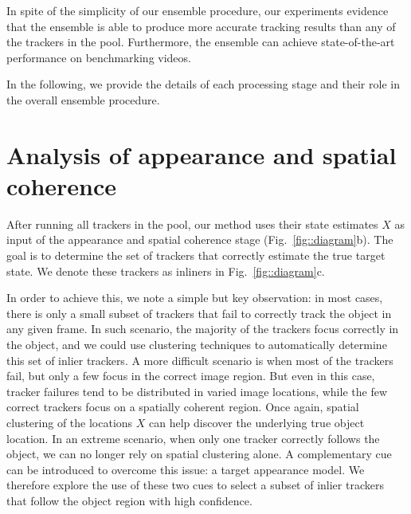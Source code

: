 In spite of the simplicity of our ensemble procedure, our experiments
evidence that the ensemble is able to produce more accurate tracking results
than any of the trackers in the pool. Furthermore, the ensemble can
achieve state-of-the-art performance on benchmarking videos.

In the following, we provide the details of each processing stage and their
role in the overall ensemble procedure.


\section{Analysis of appearance and spatial coherence}
After running all trackers in the pool, our method uses their state estimates
$X$ as input of the appearance and spatial coherence stage
(Fig.~\ref{fig::diagram}b). The goal is to determine the set of
trackers that correctly estimate the true target state. We denote these trackers
as inliners in Fig.~\ref{fig::diagram}c.

In order to achieve this, we note a simple but key observation: in most cases,
there is only a small subset of trackers that fail to correctly track the
object in any given frame.
In such scenario, the majority of the trackers focus correctly in the object,
and we could use clustering techniques to automatically determine this set
of inlier trackers.
A more difficult scenario is when most of the trackers fail, but only a few
focus in the correct image region. But even in this case, tracker failures
tend to be distributed in varied image locations, while the few correct
trackers focus on a spatially coherent region. Once again, spatial clustering
of the locations $X$ can help discover the underlying true object location.
In an extreme scenario, when only one tracker correctly follows the object,
we can no longer rely on spatial clustering alone.
A complementary cue can be introduced to overcome this issue: a target
appearance model. We therefore explore the use of these two cues
to select a subset of inlier trackers that follow the object region with
high confidence.

